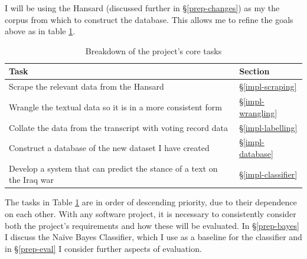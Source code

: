 \documentclass[12pt,a4paper,twoside,openright]{report}
\begin{document}
I will be using the Hansard \cite{hansard} (discussed further in \S\ref{prep-changes}) as my the corpus from which to construct the database. This allows me to refine the goals above as in table \ref{table:tasks}.
\FloatBarrier
\begin{table}[]
	\label{table:tasks}
	\centering
	\begin{tabular}{@{}ll@{}}
		\toprule
		\textbf{Task}                                                          & \textbf{Section}          \\ \midrule
		Scrape the relevant data from the Hansard                              & \S\ref{impl-scraping}   \\
		Wrangle the textual data so it is in a more consistent form          & \S\ref{impl-wrangling}  \\
	    Collate the data from the transcript with voting record data           & \S\ref{impl-labelling}  \\
	    Construct a database of the new dataset I have created            	   & \S\ref{impl-database}   \\
		Develop a system that can predict the stance of a text on the Iraq war & \S\ref{impl-classifier} \\ \bottomrule
	\end{tabular}
	\caption{Breakdown of the project's core tasks}
\end{table}
\FloatBarrier
The tasks in Table \ref{table:tasks} are in order of descending priority, due to their dependence on each other.
\newline
\newline
With any software project, it is necessary to consistently consider both the project's requirements and how these will be evaluated. In \S\ref{prep-bayes} I discuss the Na\"{i}ve Bayes Classifier, which I use as a baseline for the classifier and in \S\ref{prep-eval} I consider further aspects of evaluation.
\end{document}
